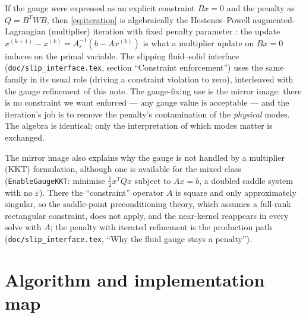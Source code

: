 \documentclass[11pt]{article}
\newcommand{\eps}{\varepsilon}
\begin{document}
If the gauge were expressed as an explicit constraint $B x = 0$ and the
penalty as $Q = B^{T} W B$, then \eqref{eq:iteration} is algebraically
the Hestenes--Powell augmented-Lagrangian (multiplier) iteration with
fixed penalty parameter \cite{Hestenes1969,Powell1969,FortinGlowinski}:
the update $x^{(k+1)} - x^{(k)} = A_\eps^{-1}(b - A x^{(k)})$ is what a
multiplier update on $Bx = 0$ induces on the primal variable. The
slipping fluid--solid interface (\texttt{doc/slip\_interface.tex},
section ``Constraint enforcement'') uses the same family in its usual
role (driving a constraint violation to zero), interleaved with the
gauge refinement of this note.
The gauge-fixing use is the mirror image: there is no constraint we
want enforced --- any gauge value is acceptable --- and the iteration's
job is to remove the penalty's contamination of the \emph{physical}
modes. The algebra is identical; only the interpretation of which modes
matter is exchanged.

The mirror image also explains why the gauge is not handled by a
multiplier (KKT) formulation, although one is available for the mixed
class (\texttt{EnableGaugeKKT}: minimise $\tfrac12 x^T Q x$ subject to
$Ax = b$, a doubled saddle system with no $\eps$). There the
``constraint'' operator $A$ is square and only approximately singular,
so the saddle-point preconditioning theory, which assumes a full-rank
rectangular constraint, does not apply, and the near-kernel reappears in
every solve with $A$; the penalty with iterated refinement is the
production path (\texttt{doc/slip\_interface.tex}, ``Why the fluid gauge
stays a penalty'').

\section{Algorithm and implementation map}
\label{sec:algorithm}
\sloppy
\end{document}
